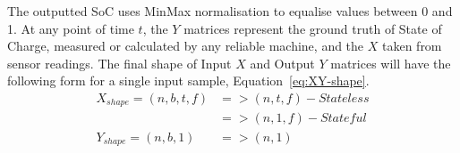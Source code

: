 The outputted SoC uses MinMax normalisation to equalise values between 0 and 1.
At any point of time $t$, the $Y$ matrices represent the ground truth of State of Charge, measured or calculated by any reliable machine, and the $X$ taken from sensor readings.
The final shape of Input $X$ and Output $Y$ matrices will have the following form for a single input sample, Equation~\ref{eq:XY-shape}.
\begin{equation}
    \begin{split}
        X_{shape} = (n, b, t, f) & => (n, t, f) - Stateless \\
                                 & => (n, 1, f) - Stateful \\
        Y_{shape} = (n, b, 1) \ \ &=> (n, 1)
    \end{split}
    \label{eq:XY-shape}
\end{equation}

